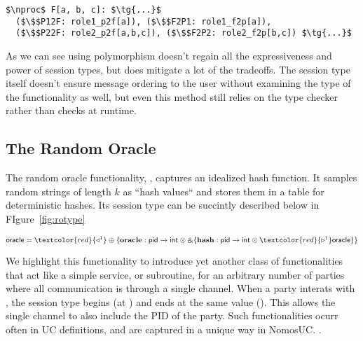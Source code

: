 \begin{lstlisting}[basicstyle=\scriptsize\BeraMonottFamily, frame=single, mathescape]
$\nproc$ F[a, b, c]: $\tg{...}$
  ($\$$P12F: role1_p2f[a]), ($\$$F2P1: role1_f2p[a]), 
  ($\$$P22F: role2_p2f[a,b,c]), ($\$$F2P2: role2_f2p[b,c]) $\tg{...}$
\end{lstlisting}

As we can see using polymorphism doesn't regain all the expressiveness and power of session types, but does mitigate a lot of the tradeoffs.
The session type itself doesn't ensure message ordering to the user without examining the type of the functionality as well, but even this method still relies on the type checker rather than checks at runtime. 

\subsection{The Random Oracle}
The random oracle functionality, \Fro, captures an idealized hash function. It samples random strings of length $k$ as ``hash values`` and stores them in a table for deterministic hashes.
Its session type can be succintly described below in FIgure~\ref{fig:rotype} 
\begin{figure*}
		\begin{center}
			\parbox{0cm}{
			\begin{tabbing}
				$\m{oracle} = \textcolor{red}{\getpot^1} \ichoice{\mb{oracle}: \m{pid} \arrow \m{int} \tensor \echoice{\mb{hash}: \m{pid} \arrow \m{int} \tensor \textcolor{red}{\paypot^1} \m{oracle}}}$
			\end{tabbing}}
		\end{center}
		\caption{The session type for the random oracle. Two channels for each party to both query hashes and send/receive messages.}
		\label{fig:rotype}
\end{figure*}
We highlight this functionality to introduce yet another class of functionalities that act like a simple service, or subroutine, for an arbitrary number of parties where all communication is through a single channel. 
When a party interats with \Fro, the session type begins (at ) and ends at the same value (). This allows the single channel to also include the PID of the party.
Such functionalities ocurr often in UC definitions, and are captured in a unique way in NomosUC.
.
